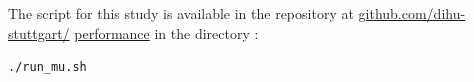 \begin{reproduce_no_break}
  The script for this study is available in the repository at \href{https://github.com/dihu-stuttgart/performance}{github.com/dihu-stuttgart/} \href{https://github.com/dihu-stuttgart/performance}{performance} in the directory :
  \begin{lstlisting}[columns=fullflexible,breaklines=true,postbreak=\mbox{\textcolor{gray}{$\hookrightarrow$}\space}]
    ./run_mu.sh
  \end{lstlisting}
\end{reproduce_no_break}

